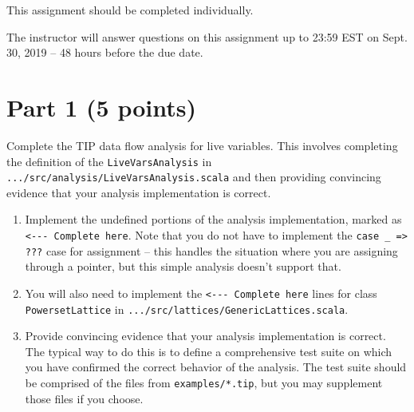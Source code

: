 \documentclass[12pt,letterpaper]{article}
\begin{document}
This assignment should be completed individually.

The instructor will answer questions on this assignment up to 23:59 EST on Sept. 30, 2019 -- 48 hours before the due date. 

\section*{Part 1 (5 points)}
Complete the TIP data flow analysis for live variables.  This involves
completing the definition of the \texttt{LiveVarsAnalysis} in \texttt{.../src/analysis/LiveVarsAnalysis.scala} and then providing convincing evidence
that your analysis implementation is correct.
\begin{enumerate}
\item Implement the undefined portions of the analysis implementation, marked as\\
 \verb|<--- Complete here|.  Note that you do not have to 
implement the \verb|case _ => ???| case for assignment -- this handles the situation where you are assigning through a pointer, but this simple analysis doesn't support that.
\item You will also need to implement the \verb|<--- Complete here| lines for class \texttt{PowersetLattice} in \texttt{.../src/lattices/GenericLattices.scala}.
\item Provide convincing evidence that your analysis implementation is correct.  The typical way to do this is to define a comprehensive test suite on which you have confirmed the correct behavior of the analysis.  The test suite should be comprised of the files from \texttt{examples/*.tip}, but you may supplement those files if you choose.
\end{enumerate}
\end{document}
